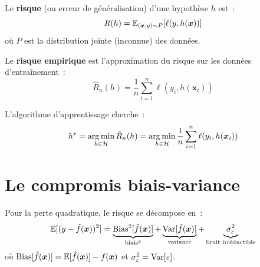 \begin{definition}[Risque]
Le \textbf{risque} (ou erreur de g\'en\'eralisation) d'une
hypoth\`ese $h$ est~:
\begin{equation}
  R(h) = \mathbb{E}_{(\bm{x}, y) \sim P}[\ell(y, h(\bm{x}))]
\end{equation}
o\`u $P$ est la distribution jointe (inconnue) des donn\'ees.
\end{definition}

\begin{definition}
Le \textbf{risque empirique} est l'approximation du
risque sur les donn\'ees d'entra\^inement~:
\begin{equation}
  \hat{R}_n(h) = \frac{1}{n} \sum_{i=1}^n \ell(y_i, h(\bm{x}_i))
\end{equation}
\end{definition}

\begin{formules}[title=\textbf{Principe de minimisation du risque empirique (ERM)}]
L'algorithme d'apprentissage cherche~:
\begin{equation}
  h^* = \operatorname*{arg\,min}_{h \in \mathcal{H}} \hat{R}_n(h) = \operatorname*{arg\,min}_{h \in \mathcal{H}}
  \frac{1}{n} \sum_{i=1}^n \ell(y_i, h(\bm{x}_i))
  \label{eq:erm}
\end{equation}
\end{formules}

\section{Le compromis biais-variance}
\label{sec:bias-variance}

\begin{theoreme}
Pour la perte quadratique, le risque se d\'ecompose en~:
\begin{equation}
  \mathbb{E}[(y - \hat{f}(\bm{x}))^2] = \underbrace{\mathrm{Bias}^2[\hat{f}(\bm{x})]}_{\text{biais}^2}
  + \underbrace{\mathrm{Var}[\hat{f}(\bm{x})]}_{\text{variance}}
  + \underbrace{\sigma^2_\varepsilon}_{\text{bruit irr\'eductible}}
\end{equation}
o\`u $\mathrm{Bias}[\hat{f}(\bm{x})] = \mathbb{E}[\hat{f}(\bm{x})] - f(\bm{x})$ et
$\sigma^2_\varepsilon = \mathrm{Var}[\varepsilon]$.
\end{theoreme}

